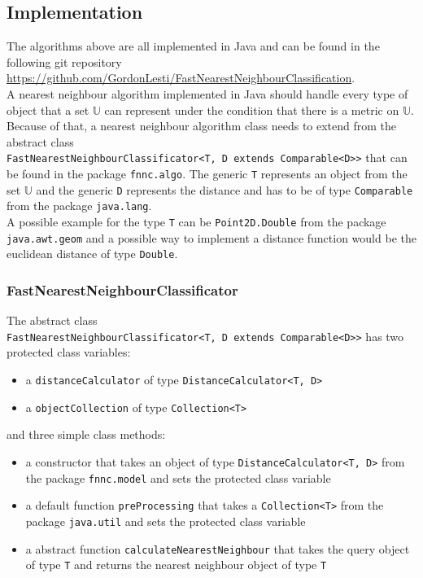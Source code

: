 \documentclass[runningheads,a4paper]{llncs}
\begin{document}
\subsection{Implementation}

The algorithms above are all implemented in Java and can be found in the following git repository\\
\url{https://github.com/GordonLesti/FastNearestNeighbourClassification}.\\

A nearest neighbour algorithm implemented in Java should handle every type of object that a set $\mathbb{U}$ can
represent under the condition that there is a metric on $\mathbb{U}$. Because of that, a nearest neighbour algorithm
class needs to extend from the abstract class\\ \verb+FastNearestNeighbourClassificator<T, D extends Comparable<D>>+
that can be found in the package \verb+fnnc.algo+. The generic \verb+T+ represents an object from the set $\mathbb{U}$
and the generic \verb+D+ represents the distance and has to be of type \verb+Comparable+ from the package
\verb+java.lang+.\\

A possible example for the type \verb+T+ can be \verb+Point2D.Double+ from the package
\verb+java.awt.geom+ and a possible way to implement a distance function would be the euclidean distance of type
\verb+Double+.

\subsubsection{FastNearestNeighbourClassificator}

The abstract class\\ \verb+FastNearestNeighbourClassificator<T, D extends Comparable<D>>+ has two protected class
variables:
\begin{itemize}
	\item a \verb+distanceCalculator+ of type \verb+DistanceCalculator<T, D>+
	\item a \verb+objectCollection+ of type \verb+Collection<T>+
\end{itemize}
and three simple class methods:
\begin{itemize}
	\item a constructor that takes an object of type \verb+DistanceCalculator<T, D>+ from the package
		\verb+fnnc.model+ and sets the protected class variable
	\item a default function \verb+preProcessing+ that takes a \verb+Collection<T>+ from the package
		\verb+java.util+ and sets the protected class variable
	\item a abstract function \verb+calculateNearestNeighbour+ that takes the query object of type \verb+T+ and
		returns the nearest neighbour object of type \verb+T+
\end{itemize}
\end{document}

